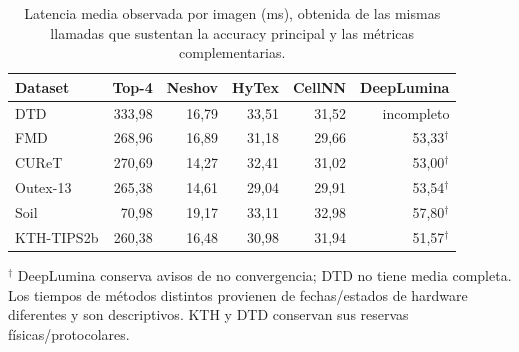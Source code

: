 \begin{table}[!htbp]\centering
\fontsize{8}{10}\selectfont\setlength{\tabcolsep}{4pt}
\caption{Latencia media observada por imagen (ms), obtenida de las mismas llamadas que sustentan la accuracy principal y las métricas complementarias.}\label{tab:tm-externos-ms}
\begin{tabular}{@{}lrrrrr@{}}\toprule
Dataset & Top-4 & Neshov & HyTex & CellNN & DeepLumina\\\midrule
DTD & 333,98 & 16,79 & 33,51 & 31,52 & incompleto\\
FMD & 268,96 & 16,89 & 31,18 & 29,66 & 53,33$^\dagger$\\
CUReT & 270,69 & 14,27 & 32,41 & 31,02 & 53,00$^\dagger$\\
Outex-13 & 265,38 & 14,61 & 29,04 & 29,91 & 53,54$^\dagger$\\
Soil & 70,98 & 19,17 & 33,11 & 32,98 & 57,80$^\dagger$\\
KTH-TIPS2b & 260,38 & 16,48 & 30,98 & 31,94 & 51,57$^\dagger$\\
\bottomrule\end{tabular}
\par\smallskip\begin{minipage}{0.98\textwidth}\footnotesize $^\dagger$ DeepLumina conserva avisos de no convergencia; DTD no tiene media completa. Los tiempos de métodos distintos provienen de fechas/estados de hardware diferentes y son descriptivos. KTH y DTD conservan sus reservas físicas/protocolares.\end{minipage}
\end{table}
